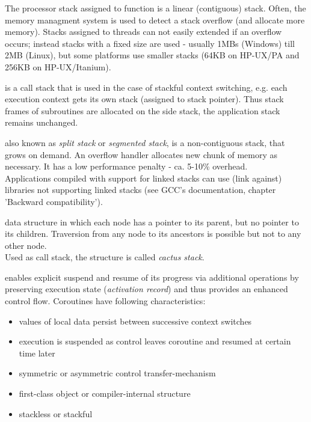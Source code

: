 The processor stack assigned to function \main is a linear (contiguous) stack.
Often, the memory managment system is used to detect a stack overflow (and
allocate more memory). Stacks assigned to threads can not easily extended if
an overflow occurs; instead stacks with a fixed size are used - usually 1MBs
(Windows) till 2MB (Linux), but some platforms use smaller stacks (64KB on
HP-UX/PA and 256KB on HP-UX/Itanium).

is a call stack that is used in the case of stackful context switching, e.g.
each execution context gets its own stack (assigned to stack pointer). Thus
stack frames of subroutines are allocated on the side stack, the application
stack remains unchanged.

also known as \emph{split stack}\cite{gccsplit} or
\emph{segmented stack}\cite{llvmseg}, is a non-contiguous stack, that grows on
demand. An overflow handler allocates new chunk of memory as necessary. It has a
low performance penalty - ca. 5-10\% overhead.\\
Applications compiled with support for linked stacks can use (link against)
libraries not supporting linked stacks (see GCC's documentation\cite{gccsplit},
chapter 'Backward compatibility').

data structure in which each node has a pointer to its parent, but no pointer to
its children. Traversion from any node to its ancestors is possible but not to
any other node.\\
Used as call stack, the structure is called \emph{cactus stack}.

enables explicit suspend and resume of its progress via additional operations by
preserving execution state (\emph{activation record}) and thus provides an
enhanced control flow. Coroutines have following characteristics\cite{N3985}:
\begin{itemize}
    \item values of local data persist between successive context switches
    \item execution is suspended as control leaves coroutine and resumed at
          certain time later
    \item symmetric or asymmetric control transfer-mechanism
    \item first-class object or compiler-internal structure
    \item stackless or stackful
\end{itemize}

